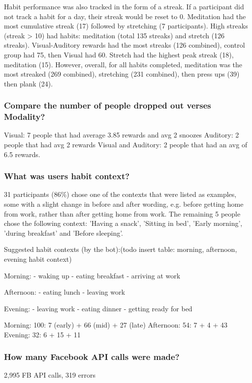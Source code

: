 Habit performance was also tracked in the form of a streak. If a participant did not track a habit for a day, their streak would be reset to 0. Meditation had the most cumulative streak (17) followed by stretching (7 participants). High streaks (streak > 10) had habits: meditation (total 135 streaks) and stretch (126 streaks). Visual-Auditory rewards had the most streaks (126 combined), control group had 75, then Visual had 60. Stretch had the highest peak streak (18), meditation (15). However, overall, for all habits completed, meditation was the most streaked (269 combined), stretching (231 combined), then press ups (39) then plank (24).

\subsubsection*{Compare the number of people dropped out verses Modality?}
Visual: 7 people that had average 3.85 rewards and avg 2 snoozes\newline
Auditory: 2 people that had avg 2 rewards\newline
Visual and Auditory: 2 people that had an avg of 6.5 rewards.

\subsubsection*{What was users habit context?}
31 participants (86\%) chose one of the contexts that were listed as examples, some with a slight change in before and after wording, e.g. before getting home from work, rather than after getting home from work. The remaining 5 people chose the following context: 'Having a snack', 'Sitting in bed', 'Early morning', 'during breakfast' and 'Before sleeping'.

Suggested habit contexts (by the bot):(todo insert table: morning, afternoon, evening habit context)

Morning:
  - waking up
  - eating breakfast
  - arriving at work

  Afternoon:
  - eating lunch
  - leaving work

  Evening:
  - leaving work
  - eating dinner
  - getting ready for bed

  Morning: 100: 7 (early) + 66 (mid) + 27 (late)
  Afternoon: 54: 7 + 4 + 43
  Evening: 32: 6 + 15 + 11




\subsubsection*{How many Facebook API calls were made?}
2,995 FB API calls, 319 errors

